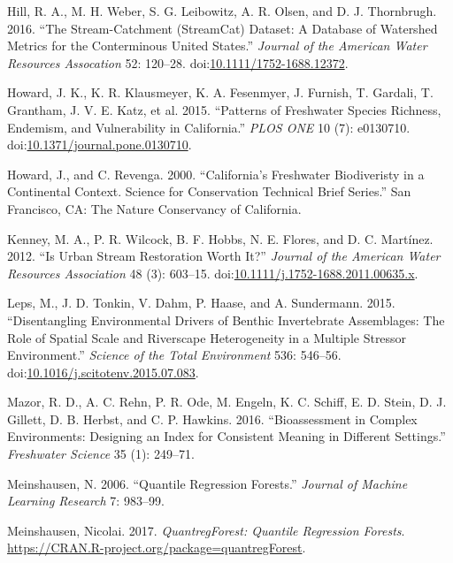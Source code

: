 \documentclass[]{article}
\begin{document}
\hypertarget{ref-Hill16}{}
Hill, R. A., M. H. Weber, S. G. Leibowitz, A. R. Olsen, and D. J.
Thornbrugh. 2016. ``The Stream-Catchment (StreamCat) Dataset: A Database
of Watershed Metrics for the Conterminous United States.'' \emph{Journal
of the American Water Resources Assocation} 52: 120--28.
doi:\href{https://doi.org/10.1111/1752-1688.12372}{10.1111/1752-1688.12372}.

\hypertarget{ref-Howard15}{}
Howard, J. K., K. R. Klausmeyer, K. A. Fesenmyer, J. Furnish, T.
Gardali, T. Grantham, J. V. E. Katz, et al. 2015. ``Patterns of
Freshwater Species Richness, Endemism, and Vulnerability in
California.'' \emph{PLOS ONE} 10 (7): e0130710.
doi:\href{https://doi.org/10.1371/journal.pone.0130710}{10.1371/journal.pone.0130710}.

\hypertarget{ref-Howard09}{}
Howard, J., and C. Revenga. 2000. ``California's Freshwater Biodiveristy
in a Continental Context. Science for Conservation Technical Brief
Series.'' San Francisco, CA: The Nature Conservancy of California.

\hypertarget{ref-Kenney12}{}
Kenney, M. A., P. R. Wilcock, B. F. Hobbs, N. E. Flores, and D. C.
Martínez. 2012. ``Is Urban Stream Restoration Worth It?'' \emph{Journal
of the American Water Resources Association} 48 (3): 603--15.
doi:\href{https://doi.org/10.1111/j.1752-1688.2011.00635.x}{10.1111/j.1752-1688.2011.00635.x}.

\hypertarget{ref-Leps15}{}
Leps, M., J. D. Tonkin, V. Dahm, P. Haase, and A. Sundermann. 2015.
``Disentangling Environmental Drivers of Benthic Invertebrate
Assemblages: The Role of Spatial Scale and Riverscape Heterogeneity in a
Multiple Stressor Environment.'' \emph{Science of the Total Environment}
536: 546--56.
doi:\href{https://doi.org/10.1016/j.scitotenv.2015.07.083}{10.1016/j.scitotenv.2015.07.083}.

\hypertarget{ref-Mazor16}{}
Mazor, R. D., A. C. Rehn, P. R. Ode, M. Engeln, K. C. Schiff, E. D.
Stein, D. J. Gillett, D. B. Herbst, and C. P. Hawkins. 2016.
``Bioassessment in Complex Environments: Designing an Index for
Consistent Meaning in Different Settings.'' \emph{Freshwater Science} 35
(1): 249--71.

\hypertarget{ref-Meinshausen06}{}
Meinshausen, N. 2006. ``Quantile Regression Forests.'' \emph{Journal of
Machine Learning Research} 7: 983--99.

\hypertarget{ref-Meinshausen17}{}
Meinshausen, Nicolai. 2017. \emph{QuantregForest: Quantile Regression
Forests}. \url{https://CRAN.R-project.org/package=quantregForest}.
\end{document}
